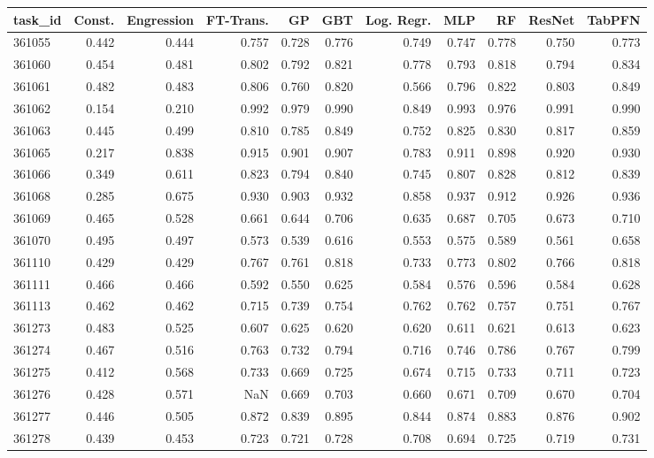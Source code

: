 \begin{tabular}{lrrrrrrrrrr}
\toprule
task\_id & Const. & Engression & FT-Trans. & GP & GBT & Log. Regr. & MLP & RF & ResNet & TabPFN \\
\midrule
361055 & 0.442 & 0.444 & 0.757 & 0.728 & 0.776 & 0.749 & 0.747 & 0.778 & 0.750 & 0.773 \\
361060 & 0.454 & 0.481 & 0.802 & 0.792 & 0.821 & 0.778 & 0.793 & 0.818 & 0.794 & 0.834 \\
361061 & 0.482 & 0.483 & 0.806 & 0.760 & 0.820 & 0.566 & 0.796 & 0.822 & 0.803 & 0.849 \\
361062 & 0.154 & 0.210 & 0.992 & 0.979 & 0.990 & 0.849 & 0.993 & 0.976 & 0.991 & 0.990 \\
361063 & 0.445 & 0.499 & 0.810 & 0.785 & 0.849 & 0.752 & 0.825 & 0.830 & 0.817 & 0.859 \\
361065 & 0.217 & 0.838 & 0.915 & 0.901 & 0.907 & 0.783 & 0.911 & 0.898 & 0.920 & 0.930 \\
361066 & 0.349 & 0.611 & 0.823 & 0.794 & 0.840 & 0.745 & 0.807 & 0.828 & 0.812 & 0.839 \\
361068 & 0.285 & 0.675 & 0.930 & 0.903 & 0.932 & 0.858 & 0.937 & 0.912 & 0.926 & 0.936 \\
361069 & 0.465 & 0.528 & 0.661 & 0.644 & 0.706 & 0.635 & 0.687 & 0.705 & 0.673 & 0.710 \\
361070 & 0.495 & 0.497 & 0.573 & 0.539 & 0.616 & 0.553 & 0.575 & 0.589 & 0.561 & 0.658 \\
361110 & 0.429 & 0.429 & 0.767 & 0.761 & 0.818 & 0.733 & 0.773 & 0.802 & 0.766 & 0.818 \\
361111 & 0.466 & 0.466 & 0.592 & 0.550 & 0.625 & 0.584 & 0.576 & 0.596 & 0.584 & 0.628 \\
361113 & 0.462 & 0.462 & 0.715 & 0.739 & 0.754 & 0.762 & 0.762 & 0.757 & 0.751 & 0.767 \\
361273 & 0.483 & 0.525 & 0.607 & 0.625 & 0.620 & 0.620 & 0.611 & 0.621 & 0.613 & 0.623 \\
361274 & 0.467 & 0.516 & 0.763 & 0.732 & 0.794 & 0.716 & 0.746 & 0.786 & 0.767 & 0.799 \\
361275 & 0.412 & 0.568 & 0.733 & 0.669 & 0.725 & 0.674 & 0.715 & 0.733 & 0.711 & 0.723 \\
361276 & 0.428 & 0.571 & NaN & 0.669 & 0.703 & 0.660 & 0.671 & 0.709 & 0.670 & 0.704 \\
361277 & 0.446 & 0.505 & 0.872 & 0.839 & 0.895 & 0.844 & 0.874 & 0.883 & 0.876 & 0.902 \\
361278 & 0.439 & 0.453 & 0.723 & 0.721 & 0.728 & 0.708 & 0.694 & 0.725 & 0.719 & 0.731 \\

\end{tabular}
